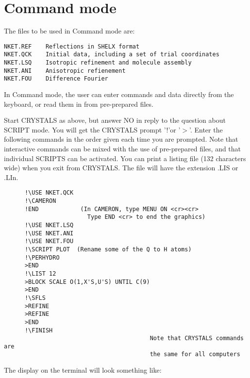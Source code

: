 \documentclass[10pt,a4paper]{report}
\begin{document}
\section{Command mode}


 The files to be used in Command mode are:
\small\begin{verbatim}
NKET.REF    Reflections in SHELX format
NKET.QCK    Initial data, including a set of trial coordinates
NKET.LSQ    Isotropic refinement and molecule assembly
NKET.ANI    Anisotropic refienement
NKET.FOU    Difference Fourier
\end{verbatim}\normalsize




In Command mode, the user can enter commands and data directly from
the keyboard, or read them in from pre-prepared files.



 Start CRYSTALS as above, but answer NO in reply
 to the question about SCRIPT mode. You
 will get the CRYSTALS prompt '!'or '$>$'.
 Enter the following commands in the
 order given  each time you are prompted. Note that interactive commands
 can be mixed with the use of pre-prepared files, and that individual
 SCRIPTS can be activated.
 You can print a listing file (132 characters
 wide)
 when you exit from CRYSTALS. The file will have the extension .LIS or .LIn.

\small\begin{verbatim}
      !\USE NKET.QCK
      !\CAMERON
      !END            (In CAMERON, type MENU ON <cr><cr>
                        Type END <cr> to end the graphics)
      !\USE NKET.LSQ
      !\USE NKET.ANI
      !\USE NKET.FOU
      !\SCRIPT PLOT  (Rename some of the Q to H atoms)
      !\PERHYDRO
      >END
      !\LIST 12
      >BLOCK SCALE O(1,X'S,U'S) UNTIL C(9)
      >END
      !\SFLS
      >REFINE
      >REFINE
      >END
      !\FINISH
                                          Note that CRYSTALS commands are
                                          the same for all computers
\end{verbatim}\normalsize




The display on the terminal will look something like:
\end{document}
